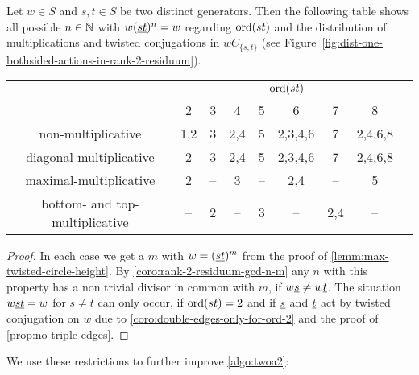 \begin{coro}
	Let $w \in S$ and $s,t \in S$ be two distinct generators. Then the following table shows all possible $n \in \mathbb{N}$ with $w(\underline{s} \underline{t})^n = w$ regarding $\operatorname{ord}(st)$ and the distribution of multiplications and twisted conjugations in $wC_{\{s,t\}}$ (see Figure~\ref{fig:dist-one-bothsided-actions-in-rank-2-residuum}).

	\begin{center}
		\begin{tabular}{c|ccccccc|c}
													& \multicolumn{7}{c|}{$\operatorname{ord}(st)$} \\
													& 2 & 3 & 4 & 5 & 6 & 7 & 8 \\
			\hline
			\textrm{non-multiplicative}				& 1,2 & 3 & 2,4 & 5 & 2,3,4,6 & 7 & 2,4,6,8 \\
			\textrm{diagonal-multiplicative}		& 2 & 3 & 2,4 & 5 & 2,3,4,6 & 7 & 2,4,6,8 \\
			\textrm{maximal-multiplicative}			& 2 & -- & 3 & -- & 2,4 & -- & 5 \\
			\textrm{bottom- and top-multiplicative}	& -- & 2 & -- & 3 & -- & 2,4 & -- \\
		\end{tabular}		
	\end{center}

	\begin{proof}
		In each case we get a $m$ with $w = (\underline{s} \underline{t})^m$ from the proof of \ref{lemm:max-twisted-circle-height}. By \ref{coro:rank-2-residuum-gcd-n-m} any $n$ with this property has a non trivial divisor in common with $m$, if $w \underline{s} \neq w \underline{t}$. The situation $w \underline{s} \underline{t} = w$ for $s \neq t$ can only occur, if $\operatorname{ord}(st) = 2$ and if $\underline{s}$ and $\underline{t}$ act by twisted conjugation on $w$ due to \ref{coro:double-edges-only-for-ord-2} and the proof of \ref{prop:no-triple-edges}.
	\end{proof}
\end{coro}

We use these restrictions to further improve \ref{algo:twoa2}:

\begin{algo}[TWOA3]
	\todo
\end{algo}